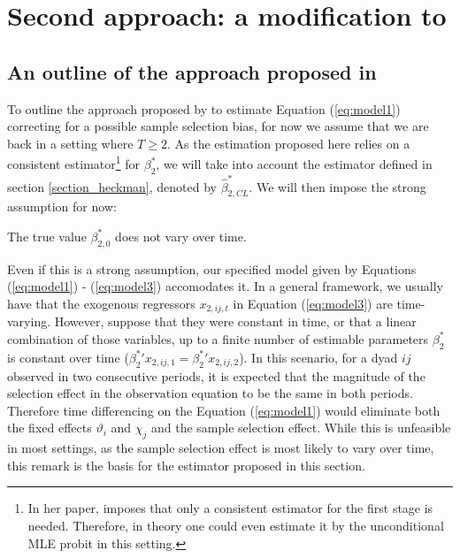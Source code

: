\section{Second approach: a modification to \cite{kyriazidou1997estimation}} \label{sample_selection_alternative}

\subsection{An outline of the approach proposed in \cite{kyriazidou1997estimation}}

To outline the approach proposed by \cite{kyriazidou1997estimation} to estimate Equation (\ref{eq:model1}) correcting for a possible sample selection bias, for now we assume that we are back in a setting where $T \geq 2$. As the estimation proposed here relies on a consistent estimator\footnote{In her paper, \cite{kyriazidou1997estimation} imposes that only a consistent estimator for the first stage is needed. Therefore, in theory one could even estimate it by the unconditional MLE probit in this setting.} for $\beta_2^*$, we will take into account the estimator defined in section \ref{section_heckman}, denoted by $\hat{\beta}_{2,CL}^*$. We will then impose the strong assumption for now:

\begin{assumption}
    The true value $\beta_{2,0}^*$ does not vary over time.
\end{assumption}

Even if this is a strong assumption, our specified model given by Equations (\ref{eq:model1}) - (\ref{eq:model3}) accomodates it.
In a general framework, we usually have that the exogenous regressors $x_{2,ij,t}$ in Equation (\ref{eq:model3}) are time-varying. However, suppose that they were constant in time, or that a linear combination of those variables, up to a finite number of estimable parameters $\beta_2^*$ is constant over time (${\beta_2^*}'x_{2,ij,1} = {\beta_2^*}'x_{2,ij,2}$). In this scenario, for a dyad $ij$ observed in two consecutive periods, it is expected that the magnitude of the selection effect in the observation equation to be the same in both periods. Therefore time differencing on the Equation (\ref{eq:model1}) would eliminate both the fixed effects $\vartheta_i$ and $\chi_j$ and the sample selection effect. While this is unfeasible in most settings, as the sample selection effect is most likely to vary over time, this remark is the basis for the estimator proposed in this section.

